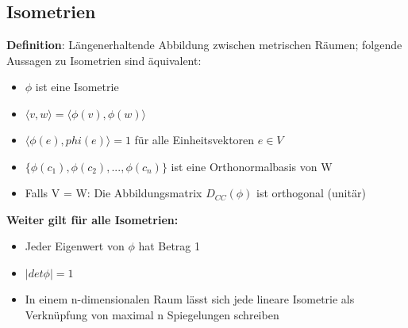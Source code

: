 \documentclass[10pt,a4paper]{article}
\begin{document}
	\subsection{Isometrien}
	\textbf{Definition}: Längenerhaltende Abbildung zwischen metrischen Räumen; folgende Aussagen zu Isometrien sind äquivalent:
	\begin{itemize}
		\item $\phi$ ist eine Isometrie
		\item $\langle v, w\rangle = \langle \phi(v), \phi(w)\rangle$
		\item $\langle \phi(e), phi(e)\rangle = 1$ für alle Einheitsvektoren $e \in V$
		\item $\{\phi(c_1), \phi(c_2), ..., \phi(c_n)\}$ ist eine Orthonormalbasis von W
		\item Falls V = W: Die Abbildungsmatrix $D_{CC}(\phi)$ ist orthogonal (unitär)
	\end{itemize}
	\textbf{Weiter gilt für alle Isometrien:}
	\begin{itemize}
		\item Jeder Eigenwert von $\phi$ hat Betrag 1
		\item $|det \phi| = 1$
		\item In einem n-dimensionalen Raum lässt sich jede lineare Isometrie als Verknüpfung von maximal n Spiegelungen schreiben
	\end{itemize}
\end{document}
